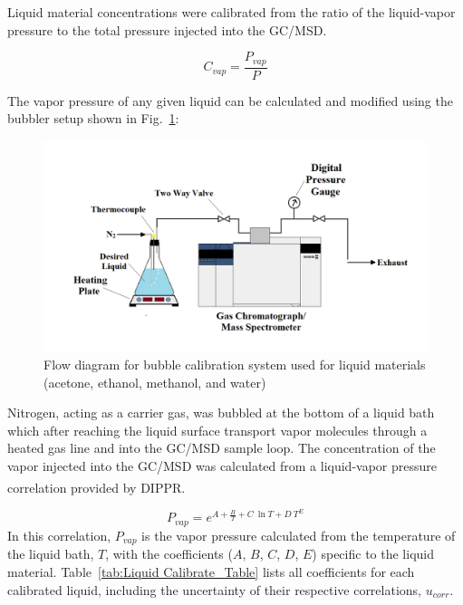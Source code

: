 \documentclass[12pt]{article}
\begin{document}
Liquid material concentrations were calibrated from the ratio of the liquid-vapor pressure to the total pressure injected into the GC/MSD.

\begin{equation}
\label{eq:liquid_vapor_concentration}
C_{vap} =\frac {P_{vap}}{P}
\end{equation}

The vapor pressure of any given liquid can be calculated and modified using the bubbler setup shown in Fig.~\ref{fig:Bubbler}:

\begin{figure}[h!]
	\centering
\includegraphics[width=\textwidth,keepaspectratio]{Bubbler_Setup.png}
	\caption[Flow diagram for bubble calibration system used for liquid materials]{Flow diagram for bubble calibration system used for liquid materials (acetone, ethanol, methanol, and water)}
	\label{fig:Bubbler}
\end{figure}
Nitrogen, acting as a carrier gas, was bubbled at the bottom of a liquid bath which after reaching the liquid surface transport vapor molecules through a heated gas line and into the GC/MSD sample loop. The concentration of the vapor injected into the GC/MSD was calculated from a liquid-vapor pressure correlation provided by DIPPR\textsuperscript{\textregistered}.

\begin{equation}
\label{eq:liquid_vapor_pressure_correlation}
P_{vap} =e^{A+\frac{B}{T}+C~\ln{T}+D~T^{E}}
\end{equation}
In this correlation, $P_{vap}$ is the vapor pressure calculated from the temperature of the liquid bath, $T$, with the coefficients ($A$, $B$, $C$, $D$, $E$) specific to the liquid material. Table~\ref{tab:Liquid Calibrate_Table} lists all coefficients for each calibrated liquid, including the uncertainty of their respective correlations, $u_{corr}$.
\end{document}
